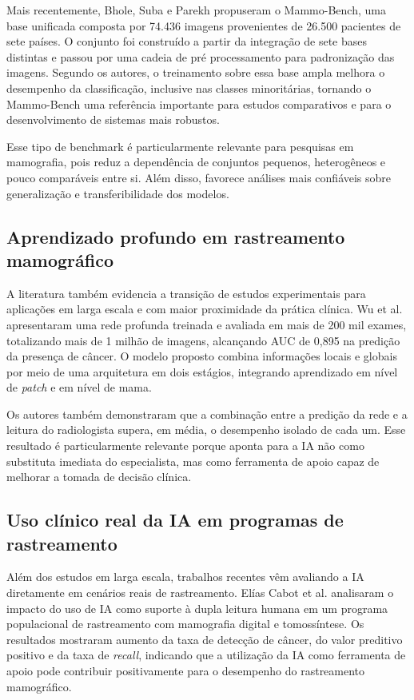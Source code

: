 Mais recentemente, Bhole, Suba e Parekh \cite{bhole2025} propuseram o Mammo-Bench, uma base unificada composta por 74.436 imagens provenientes de 26.500 pacientes de sete países. O conjunto foi construído a partir da integração de sete bases distintas e passou por uma cadeia de pré processamento para padronização das imagens. Segundo os autores, o treinamento sobre essa base ampla melhora o desempenho da classificação, inclusive nas classes minoritárias, tornando o Mammo-Bench uma referência importante para estudos comparativos e para o desenvolvimento de sistemas mais robustos.

Esse tipo de benchmark é particularmente relevante para pesquisas em mamografia, pois reduz a dependência de conjuntos pequenos, heterogêneos e pouco comparáveis entre si. Além disso, favorece análises mais confiáveis sobre generalização e transferibilidade dos modelos.

\subsection{Aprendizado profundo em rastreamento mamográfico}

A literatura também evidencia a transição de estudos experimentais para aplicações em larga escala e com maior proximidade da prática clínica. Wu et al. \cite{wu2020} apresentaram uma rede profunda treinada e avaliada em mais de 200 mil exames, totalizando mais de 1 milhão de imagens, alcançando AUC de 0{,}895 na predição da presença de câncer. O modelo proposto combina informações locais e globais por meio de uma arquitetura em dois estágios, integrando aprendizado em nível de \textit{patch} e em nível de mama.

Os autores também demonstraram que a combinação entre a predição da rede e a leitura do radiologista supera, em média, o desempenho isolado de cada um. Esse resultado é particularmente relevante porque aponta para a IA não como substituta imediata do especialista, mas como ferramenta de apoio capaz de melhorar a tomada de decisão clínica.

\subsection{Uso clínico real da IA em programas de rastreamento}

Além dos estudos em larga escala, trabalhos recentes vêm avaliando a IA diretamente em cenários reais de rastreamento. Elías Cabot et al. \cite{eliascabot2024} analisaram o impacto do uso de IA como suporte à dupla leitura humana em um programa populacional de rastreamento com mamografia digital e tomossíntese. Os resultados mostraram aumento da taxa de detecção de câncer, do valor preditivo positivo e da taxa de \textit{recall}, indicando que a utilização da IA como ferramenta de apoio pode contribuir positivamente para o desempenho do rastreamento mamográfico.

